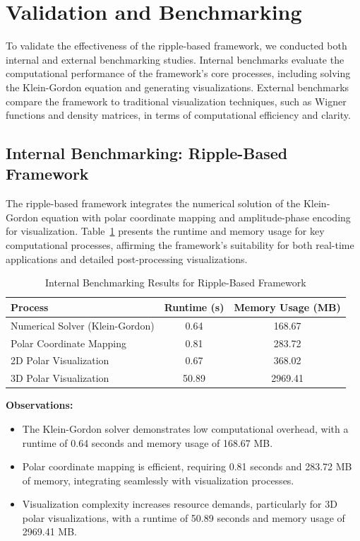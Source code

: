 \documentclass[12pt]{article}
\begin{document}
\section{Validation and Benchmarking}

To validate the effectiveness of the ripple-based framework, we conducted both internal and external benchmarking studies. Internal benchmarks evaluate the computational performance of the framework's core processes, including solving the Klein-Gordon equation and generating visualizations. External benchmarks compare the framework to traditional visualization techniques, such as Wigner functions and density matrices, in terms of computational efficiency and clarity.

\subsection{Internal Benchmarking: Ripple-Based Framework}

The ripple-based framework integrates the numerical solution of the Klein-Gordon equation with polar coordinate mapping and amplitude-phase encoding for visualization. Table~\ref{tab:benchmark_ripple} presents the runtime and memory usage for key computational processes, affirming the framework's suitability for both real-time applications and detailed post-processing visualizations.

\begin{table}[H]
\centering
\caption{Internal Benchmarking Results for Ripple-Based Framework}
\begin{tabular}{|l|c|c|}
    \hline
    \textbf{Process} & \textbf{Runtime (s)} & \textbf{Memory Usage (MB)} \\
    \hline
    Numerical Solver (Klein-Gordon) & 0.64 & 168.67 \\
    Polar Coordinate Mapping & 0.81 & 283.72 \\
    2D Polar Visualization & 0.67 & 368.02 \\
    3D Polar Visualization & 50.89 & 2969.41 \\
    \hline
\end{tabular}
\label{tab:benchmark_ripple}
\end{table}

\textbf{Observations:}
\begin{itemize}
    \item The Klein-Gordon solver demonstrates low computational overhead, with a runtime of 0.64 seconds and memory usage of 168.67 MB.
    \item Polar coordinate mapping is efficient, requiring 0.81 seconds and 283.72 MB of memory, integrating seamlessly with visualization processes.
    \item Visualization complexity increases resource demands, particularly for 3D polar visualizations, with a runtime of 50.89 seconds and memory usage of 2969.41 MB.
\end{itemize}
\end{document}
